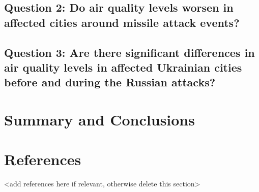 \documentclass[
  12pt,
]{article}
\begin{document}
\hypertarget{question-2-do-air-quality-levels-worsen-in-affected-cities-around-missile-attack-events}{%
\subsection{Question 2: Do air quality levels worsen in affected cities
around missile attack
events?}\label{question-2-do-air-quality-levels-worsen-in-affected-cities-around-missile-attack-events}}

\hypertarget{question-3-are-there-significant-differences-in-air-quality-levels-in-affected-ukrainian-cities-before-and-during-the-russian-attacks}{%
\subsection{Question 3: Are there significant differences in air quality
levels in affected Ukrainian cities before and during the Russian
attacks?}\label{question-3-are-there-significant-differences-in-air-quality-levels-in-affected-ukrainian-cities-before-and-during-the-russian-attacks}}

\newpage

\hypertarget{summary-and-conclusions}{%
\section{Summary and Conclusions}\label{summary-and-conclusions}}

\newpage

\hypertarget{references}{%
\section{References}\label{references}}

\textless add references here if relevant, otherwise delete this
section\textgreater{}
\end{document}
